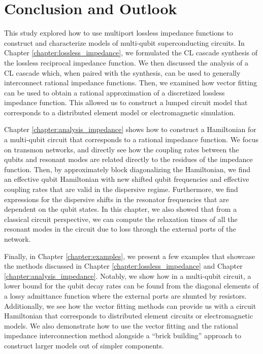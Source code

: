 \chapter{Conclusion and Outlook}

This study explored how to use multiport lossless impedance functions to construct and characterize models of multi-qubit superconducting circuits. In Chapter \ref{chapter:lossless_impedance}, we formulated the CL cascade synthesis of the lossless reciprocal impedance function. We then discussed the analysis of a CL cascade which, when paired with the synthesis, can be used to generally interconnect rational impedance functions. Then, we examined how vector fitting can be used to obtain a rational approximation of a discretized lossless impedance function. This allowed us to construct a lumped circuit model that corresponds to a distributed element model or electromagnetic simulation.

Chapter \ref{chapter:analysis_impedance} shows how to construct a Hamiltonian for a multi-qubit circuit that corresponds to a rational impedance function. We focus on transmon networks, and directly see how the coupling rates between the qubits and resonant modes are related directly to the residues of the impedance function. Then, by approximately block diagonalizing the Hamiltonian, we find an effective qubit Hamiltonian with new shifted qubit frequencies and effective coupling rates that are valid in the dispersive regime. Furthermore, we find expressions for the dispersive shifts in the resonator frequencies that are dependent on the qubit states. In this chapter, we also showed that from a classical circuit perspective, we can compute the relaxation times of all the resonant modes in the circuit due to loss through the external ports of the network.

Finally, in Chapter \ref{chapter:examples}, we present a few examples that showcase the methods discussed in Chapter \ref{chapter:lossless_impedance} and Chapter \ref{chapter:analysis_impedance}. Notably, we show how in a multi-qubit circuit, a lower bound for the qubit decay rates can be found from the diagonal elements of a lossy admittance function where the external ports are shunted by resistors. Additionally, we see how the vector fitting methods can provide us with a circuit Hamiltonian that corresponds to distributed element circuits or electromagnetic models. We also demonstrate how to use the vector fitting and the rational impedance interconnection method alongside a ``brick building” approach to construct larger models out of simpler components.

